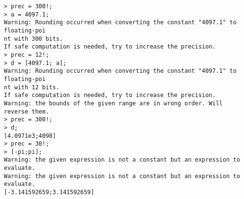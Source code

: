 \begin{center}\begin{minipage}{15cm}\begin{Verbatim}[frame=single]
> prec = 300!;
> a = 4097.1;
Warning: Rounding occurred when converting the constant "4097.1" to floating-poi
nt with 300 bits.
If safe computation is needed, try to increase the precision.
> prec = 12!;
> d = [4097.1; a];
Warning: Rounding occurred when converting the constant "4097.1" to floating-poi
nt with 12 bits.
If safe computation is needed, try to increase the precision.
Warning: the bounds of the given range are in wrong order. Will reverse them.
> prec = 300!;
> d;
[4.0971e3;4098]
> prec = 30!;
> [-pi;pi];
Warning: the given expression is not a constant but an expression to evaluate.
Warning: the given expression is not a constant but an expression to evaluate.
[-3.141592659;3.141592659]
\end{Verbatim}
\end{minipage}\end{center}
